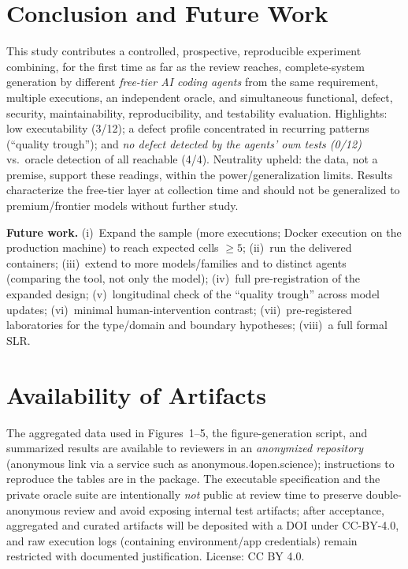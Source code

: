 \documentclass[sigconf,anonymous]{acmart}
\begin{document}
\section{Conclusion and Future Work}
This study contributes a controlled, prospective, reproducible experiment combining, for the first time as far as the review reaches, complete-system generation by different \emph{free-tier AI coding agents} from the same requirement, multiple executions, an independent oracle, and simultaneous functional, defect, security, maintainability, reproducibility, and testability evaluation. Highlights: low executability (3/12); a defect profile concentrated in recurring patterns (``quality trough''); and \emph{no defect detected by the agents' own tests (0/12)} vs.\ oracle detection of all reachable (4/4). Neutrality upheld: the data, not a premise, support these readings, within the power/generalization limits. Results characterize the free-tier layer at collection time and should not be generalized to premium/frontier models without further study.

\textbf{Future work.} (i)~Expand the sample (more executions; Docker execution on the production machine) to reach expected cells $\ge5$; (ii)~run the delivered containers; (iii)~extend to more models/families and to distinct agents (comparing the tool, not only the model); (iv)~full pre-registration of the expanded design; (v)~longitudinal check of the ``quality trough'' across model updates; (vi)~minimal human-intervention contrast; (vii)~pre-registered laboratories for the type/domain and boundary hypotheses; (viii)~a full formal SLR.

\section*{Availability of Artifacts}
The aggregated data used in Figures~1--5, the figure-generation script, and summarized results are available to reviewers in an \emph{anonymized repository} (anonymous link via a service such as anonymous.4open.science); instructions to reproduce the tables are in the package. The executable specification and the private oracle suite are intentionally \emph{not} public at review time to preserve double-anonymous review and avoid exposing internal test artifacts; after acceptance, aggregated and curated artifacts will be deposited with a DOI under CC-BY-4.0, and raw execution logs (containing environment/app credentials) remain restricted with documented justification. License: CC BY 4.0.
\end{document}

